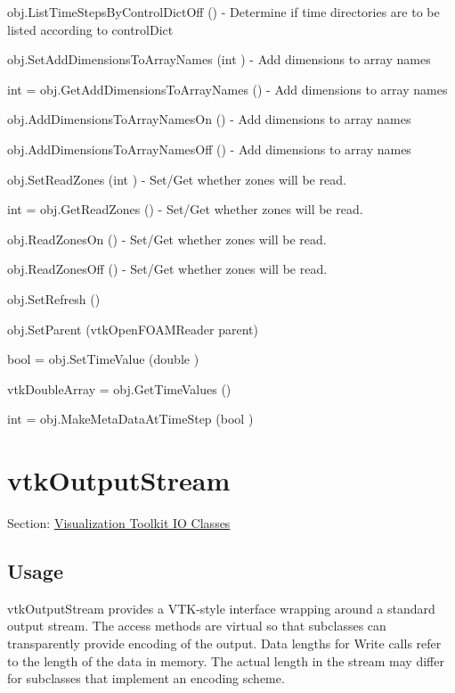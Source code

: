 \begin{DoxyItemize}
\item {\ttfamily obj.\-List\-Time\-Steps\-By\-Control\-Dict\-Off ()} -\/ Determine if time directories are to be listed according to control\-Dict  
\item {\ttfamily obj.\-Set\-Add\-Dimensions\-To\-Array\-Names (int )} -\/ Add dimensions to array names  
\item {\ttfamily int = obj.\-Get\-Add\-Dimensions\-To\-Array\-Names ()} -\/ Add dimensions to array names  
\item {\ttfamily obj.\-Add\-Dimensions\-To\-Array\-Names\-On ()} -\/ Add dimensions to array names  
\item {\ttfamily obj.\-Add\-Dimensions\-To\-Array\-Names\-Off ()} -\/ Add dimensions to array names  
\item {\ttfamily obj.\-Set\-Read\-Zones (int )} -\/ Set/\-Get whether zones will be read.  
\item {\ttfamily int = obj.\-Get\-Read\-Zones ()} -\/ Set/\-Get whether zones will be read.  
\item {\ttfamily obj.\-Read\-Zones\-On ()} -\/ Set/\-Get whether zones will be read.  
\item {\ttfamily obj.\-Read\-Zones\-Off ()} -\/ Set/\-Get whether zones will be read.  
\item {\ttfamily obj.\-Set\-Refresh ()}  
\item {\ttfamily obj.\-Set\-Parent (vtk\-Open\-F\-O\-A\-M\-Reader parent)}  
\item {\ttfamily bool = obj.\-Set\-Time\-Value (double )}  
\item {\ttfamily vtk\-Double\-Array = obj.\-Get\-Time\-Values ()}  
\item {\ttfamily int = obj.\-Make\-Meta\-Data\-At\-Time\-Step (bool )}  
\end{DoxyItemize}\hypertarget{vtkio_vtkoutputstream}{}\section{vtk\-Output\-Stream}\label{vtkio_vtkoutputstream}
Section\-: \hyperlink{sec_vtkio}{Visualization Toolkit I\-O Classes} \hypertarget{vtkwidgets_vtkxyplotwidget_Usage}{}\subsection{Usage}\label{vtkwidgets_vtkxyplotwidget_Usage}
vtk\-Output\-Stream provides a V\-T\-K-\/style interface wrapping around a standard output stream. The access methods are virtual so that subclasses can transparently provide encoding of the output. Data lengths for Write calls refer to the length of the data in memory. The actual length in the stream may differ for subclasses that implement an encoding scheme.

